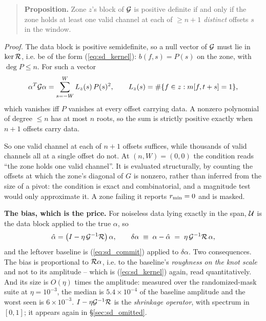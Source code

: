 \documentclass{article}
\numberwithin{equation}{section}   %
\begin{document}
\begin{quote}
{\bf Proposition.}  Zone $z$'s block of ${\cal G}$ is positive definite if and only if the zone holds at least
one valid channel at each of $\ge n+1$ {\em distinct} offsets $s$ in the window.
\end{quote}

{\em Proof.}  The data block is positive semidefinite, so a null vector of ${\cal G}$ must lie in
$\ker{\cal R}$, i.e. be of the form (\ref{eq:sd_kernel}): $b(f,s) = P(s)$ on the zone, with $\deg P \le n$.
For such a vector
\begin{equation}
\alpha^T{\cal G}\alpha = \sum_{s=-W}^{W} L_z(s)\, P(s)^2 ,
\qquad L_z(s) = \#\{f \in z : m[f,t+s] = 1\},
\end{equation}
which vanishes iff $P$ vanishes at every offset carrying data.  A nonzero polynomial of degree $\le n$ has at
most $n$ roots, so the sum is strictly positive exactly when $n+1$ offsets carry data.

So one valid channel at each of $n+1$ offsets suffices, while thousands of valid channels all at a single
offset do not.  At $(n,W) = (0,0)$ the condition reads ``the zone holds one valid channel''.  It is evaluated
structurally, by counting the offsets at which the zone's diagonal of $G$ is nonzero, rather than inferred from
the size of a pivot: the condition is exact and combinatorial, and a magnitude test would only approximate it.
A zone failing it reports $r_{\rm min} = 0$ and is masked.

{\bf The bias, which is the price.}  For noiseless data lying exactly in the span, ${\cal U}$ is the data block
applied to the true $\alpha$, so
\begin{equation}
\hat\alpha = \big(I - \eta\,{\cal G}^{-1}{\cal R}\big)\,\alpha ,
\qquad
\delta\alpha \;\equiv\; \alpha - \hat\alpha \;=\; \eta\,{\cal G}^{-1}{\cal R}\,\alpha ,
\label{eq:sd_bias}
\end{equation}
and the leftover baseline is (\ref{eq:sd_commit}) applied to $\delta\alpha$.  Two consequences.  The bias is proportional to
${\cal R}\alpha$, i.e. to the baseline's {\em roughness on the knot scale} and not to its amplitude -- which is
(\ref{eq:sd_kernel}) again, read quantitatively.  And its size is $O(\eta)$ times the amplitude: measured over
the randomized-mask suite at $\eta = 10^{-3}$, the median is $5.4\times10^{-4}$ of the baseline amplitude and
the worst seen is $6\times10^{-3}$.  $I - \eta{\cal G}^{-1}{\cal R}$ is the {\em shrinkage operator}, with
spectrum in $[0,1]$; it appears again in \S\ref{sec:sd_omitted}.
\end{document}
